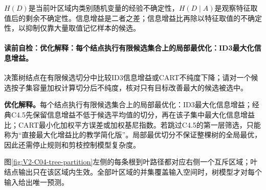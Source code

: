 \label{struct:V2-C04-CH15}
\begin{probabilitybox}
$H(D)$是当前叶区域内类别随机变量的经验不确定性，$H(D\mid A)$是观察特征取值后的剩余不确定性。信息增益是二者之差；信息增益比再除以特征取值的不确定性，以抑制仅靠大量取值记忆样本的候选。
\end{probabilitybox}

\label{struct:V2-C04-CH16}
\paragraph{读前自检：优化解释：每个结点执行有限候选集合上的局部最优化：ID3最大化信息增益。}决策树结点在有限候选切分中比较ID3信息增益或CART不纯度下降；请对一个候选按子集容量加权计算切分后不纯度，核对只有目标改善最大的候选被选中。\par

\begin{optimizationbox}
\textbf{优化解释。}每个结点执行有限候选集合上的局部最优化：ID3最大化信息增益；经典C4.5先保留信息增益不低于候选平均值的切分，再在该子集中最大化信息增益比；CART最小化加权平方误差或加权基尼指数。若跳过C4.5的第一层筛选，只能称为“直接最大化增益比的教学简化版”。局部最优切分不保证整棵树的全局最优，因此还需停止规则和剪枝控制模型复杂度。
\end{optimizationbox}

\label{struct:V2-C04-CH17}

图\ref{fig:V2-C04-tree-partition}左侧的每条根到叶路径都对应右侧一个互斥区域；叶结点输出只在该区域内生效。全部叶区域的并集覆盖输入空间时，树模型才对每个输入给出唯一预测。

